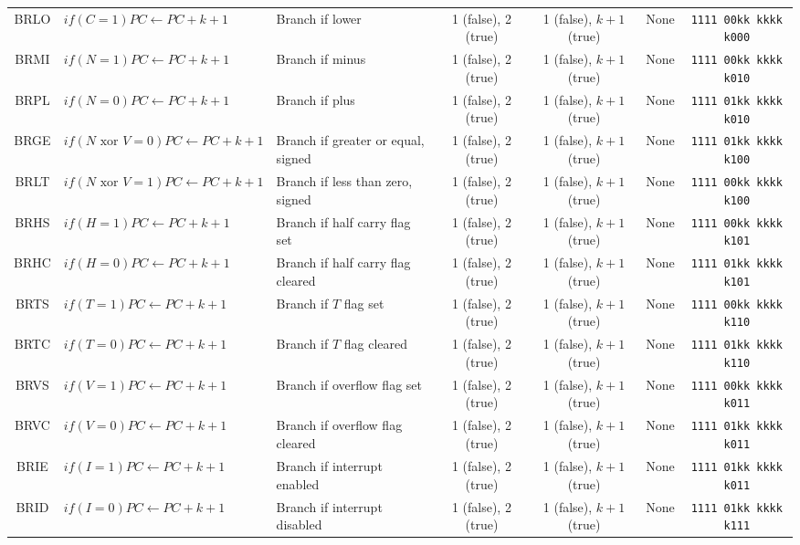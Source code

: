 \documentclass[11pt]{article}
\begin{document}
\begin{center}
\begin{longtable}{|c|m{10em}|l|c|c|c|c|}
BRLO & $if(C = 1) PC \leftarrow PC + k + 1$ & Branch if lower & 1 (false), 2 (true) & 1 (false), $k+1$ (true) & None & \texttt{1111 00kk kkkk k000}\\
BRMI & $if(N = 1) PC \leftarrow PC + k + 1$ & Branch if minus & 1 (false), 2 (true) & 1 (false), $k+1$ (true) & None & \texttt{1111 00kk kkkk k010}\\
BRPL & $if(N = 0) PC \leftarrow PC + k + 1$ & Branch if plus & 1 (false), 2 (true) & 1 (false), $k+1$ (true) & None & \texttt{1111 01kk kkkk k010}\\
BRGE & $if(N \text{ xor } V = 0) PC \leftarrow PC + k + 1$ & Branch if greater or equal, signed & 1 (false), 2 (true) & 1 (false), $k+1$ (true) & None & \texttt{1111 01kk kkkk k100}\\
BRLT & $if(N \text{ xor } V = 1) PC \leftarrow PC + k + 1$ & Branch if less than zero, signed & 1 (false), 2 (true) & 1 (false), $k+1$ (true) & None & \texttt{1111 00kk kkkk k100}\\
BRHS & $if(H = 1) PC \leftarrow PC + k + 1$ & Branch if half carry flag set & 1 (false), 2 (true) & 1 (false), $k+1$ (true) & None & \texttt{1111 00kk kkkk k101}\\
BRHC & $if(H = 0) PC \leftarrow PC + k + 1$ & Branch if half carry flag cleared & 1 (false), 2 (true) & 1 (false), $k+1$ (true) & None & \texttt{1111 01kk kkkk k101}\\
BRTS & $if(T = 1) PC \leftarrow PC + k + 1$ & Branch if $T$ flag set & 1 (false), 2 (true) & 1 (false), $k+1$ (true) & None & \texttt{1111 00kk kkkk k110}\\
BRTC & $if(T = 0) PC \leftarrow PC + k + 1$ & Branch if $T$ flag cleared & 1 (false), 2 (true) & 1 (false), $k+1$ (true) & None & \texttt{1111 01kk kkkk k110}\\
BRVS & $if(V = 1) PC \leftarrow PC + k + 1$ & Branch if overflow flag set & 1 (false), 2 (true) & 1 (false), $k+1$ (true) & None & \texttt{1111 00kk kkkk k011}\\
BRVC & $if(V = 0) PC \leftarrow PC + k + 1$ & Branch if overflow flag cleared & 1 (false), 2 (true) & 1 (false), $k+1$ (true) & None & \texttt{1111 01kk kkkk k011}\\
BRIE & $if(I = 1) PC \leftarrow PC + k + 1$ & Branch if interrupt enabled & 1 (false), 2 (true) & 1 (false), $k+1$ (true) & None & \texttt{1111 01kk kkkk k011}\\
BRID & $if(I = 0) PC \leftarrow PC + k + 1$ & Branch if interrupt disabled & 1 (false), 2 (true) & 1 (false), $k+1$ (true) & None & \texttt{1111 01kk kkkk k111}\\

\end{longtable}
\end{center}
\end{document}
